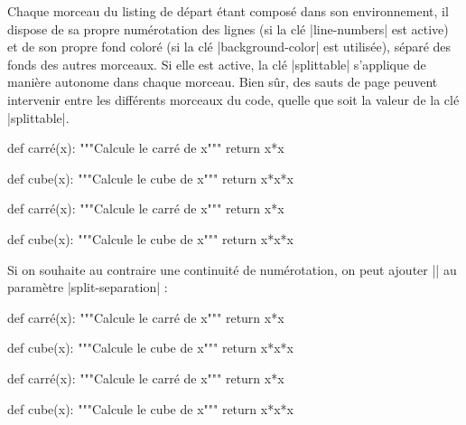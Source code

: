 \documentclass[dvipsnames,svgnames]{article}
\begin{document}
\smallskip
Chaque morceau du listing de départ étant composé dans son environnement, il dispose de sa
propre numérotation des lignes (si la clé |line-numbers| est active) et de son propre fond
coloré (si la clé |background-color| est utilisée), séparé des fonds des autres morceaux.
Si elle est active, la clé |splittable| s'applique de manière autonome dans chaque
morceau. Bien sûr, des sauts de page peuvent intervenir entre les différents morceaux du
code, quelle que soit la valeur de la clé |splittable|.

\bigskip
\begin{Code}
\begin{Piton}[\emph{split-on-empty-lines},background-color=gray!15,line-numbers]
def carré(x):
    """Calcule le carré de x"""
    return x*x

def cube(x):
    """Calcule le cube de x"""
    return x*x*x
\end{Piton}
\end{Code}

\medskip
\begin{Piton}[split-on-empty-lines,background-color=gray!15,line-numbers]
def carré(x):
    """Calcule le carré de x"""
    return x*x

def cube(x):
    """Calcule le cube de x"""
    return x*x*x
\end{Piton}


\vspace{5mm}
Si on souhaite au contraire une continuité de numérotation, on peut ajouter
|| au paramètre |split-separation| :

\bigskip
\begin{Code}
\begin{Piton}[
   split-on-empty-lines,
   \emph{split-separation += \PitonOptions{resume}} ,
   background-color=gray!15,
   line-numbers
 ]
def carré(x):
    """Calcule le carré de x"""
    return x*x

def cube(x):
    """Calcule le cube de x"""
    return x*x*x
\end{Piton}
\end{Code}

\medskip
\begin{Piton}[
   split-on-empty-lines,
   split-separation += \PitonOptions{resume} ,
   background-color=gray!15,
   line-numbers
 ]
def carré(x):
    """Calcule le carré de x"""
    return x*x

def cube(x):
    """Calcule le cube de x"""
    return x*x*x
\end{Piton}
\end{document}
